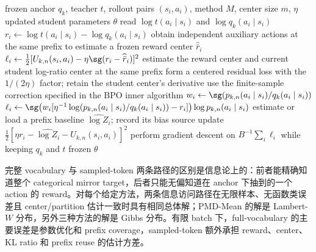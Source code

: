 \begin{algorithm}[ht]
\caption{OPD sampled-token inner update\\{\small\textit{Semantics: 每个 prefix 只访问 rollout 的下一个 token}}}
\begin{algorithmic}[1]
\Require frozen anchor $q_k$, teacher $t$, rollout pairs $(s_i,a_i)$, method $M$, center size $m$, $\eta$
\Ensure updated student parameters $\theta$
    \State read $\log t(a_i\mid s_i)$ and $\log q_k(a_i\mid s_i)$
    \State $r_i\gets\log t(a_i\mid s_i)-\log q_k(a_i\mid s_i)$
        \State obtain independent auxiliary actions at the same prefix to estimate a frozen reward center $\widehat{\bar r}_i$
        \State $\ell_i\gets\frac12[U_{k,n}(s_i,a_i)-\eta\sg(r_i-\widehat{\bar r}_i)]^2$
        \State estimate the reward center and current student log-ratio center at the same prefix
        \State form a centered residual loss with the $1/(2\eta)$ factor; retain the student center's derivative
        \State use the finite-sample correction specified in the BPO inner algorithm
        \State $w_i\gets\sg\!\left(p_{k,n}(a_i\mid s_i)/q_k(a_i\mid s_i)\right)$
        \State $\ell_i\gets\sg\!\left(w_i[\eta^{-1}\log(p_{k,n}(a_i\mid s_i)/q_k(a_i\mid s_i))-r_i]\right)\log p_{k,n}(a_i\mid s_i)$
        \State estimate or load a prefix baseline $\widehat{\log Z_i}$; record its bias source
        \State update $\frac12[\eta r_i-\widehat{\log Z_i}-U_{k,n}(s_i,a_i)]^2$
    \EndIf
\EndFor
\State perform gradient descent on $B^{-1}\sum_i\ell_i$ while keeping $q_k$ and $t$ frozen
\State \Return $\theta$
\end{algorithmic}
\end{algorithm}

完整 vocabulary 与 sampled-token 两条路径的区别是信息论上的：前者能精确知道整个 categorical mirror target，后者只能无偏知道在 anchor 下抽到的一个 action 的 reward。对每个给定方法，两条信息访问路径在无限样本、无函数类误差且 center/partition 估计一致时具有相同总体解；PMD-Mean 的解是 Lambert-$W$ 分布，另外三种方法的解是 Gibbs 分布。有限 batch 下，full-vocabulary 的主要误差是参数优化和 prefix coverage，sampled-token 额外承担 reward、center、KL ratio 和 prefix reuse 的估计方差。
